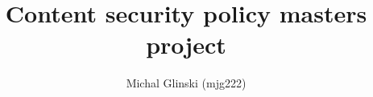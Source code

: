 \documentclass[12]{article}   %
\begin{document}
\title{Content security policy masters project} 
\author{Michal Glinski (mjg222)}    

\maketitle





\printbibliography
\end{document}
